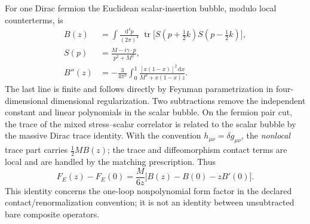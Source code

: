 \documentclass[11pt,a4paper]{article}
\theoremstyle{remark}\newtheorem{remark}[theorem]{Remark}
\newcommand{\dd}{\mathrm d}\newcommand{\Tr}{\operatorname{Tr}}\newcommand{\cO}{\mathcal O}\newcommand{\cG}{\mathcal G}\newcommand{\cH}{\mathcal H}\newcommand{\cE}{\mathcal E}\newcommand{\cK}{\mathcal K}\newcommand{\AX}{\textsf{[AXIOM]}}\newcommand{\D}{\textsf{[DERIVED]}}\newcommand{\C}{\textsf{[CONDITIONAL]}}\newcommand{\OPEN}{\textsf{[OPEN]}}
\begin{document}
For one Dirac fermion the Euclidean scalar-insertion bubble, modulo local counterterms, is
\begin{equation}\label{eq:v36-bubble}
\begin{aligned}
B(z)&=\int\!\frac{\dd^4p}{(2\pi)^4}\;\operatorname{tr}\bigl[S(p+\tfrac12 k)S(p-\tfrac12 k)\bigr],\\
S(p)&=\frac{M-i\gamma\cdot p}{p^2+M^2},\\
B''(z)&=-\frac{3}{4\pi^2}\int_0^1\!\frac{[x(1-x)]^2\,\dd x}{M^2+x(1-x)z}.
\end{aligned}
\end{equation}
The last line is finite and follows directly by Feynman parametrization in four-dimensional dimensional regularization. Two subtractions remove the independent constant and linear polynomials in the scalar bubble. On the fermion pair cut, the trace of the mixed stress--scalar correlator is related to the scalar bubble by the massive Dirac trace identity. With the convention $h_{\mu\nu}=\delta g_{\mu\nu}$, the \emph{nonlocal} trace part carries $\frac12 M B(z)$; the trace and diffeomorphism contact terms are local and are handled by the matching prescription. Thus
\begin{equation}\label{eq:v36-tracerel}
\boxed{F_E(z)-F_E(0)=\frac{M}{6z}\bigl[B(z)-B(0)-zB'(0)\bigr].}
\end{equation}
This identity concerns the one-loop nonpolynomial form factor in the declared contact/renormalization convention; it is not an identity between unsubtracted bare composite operators.
\end{document}
